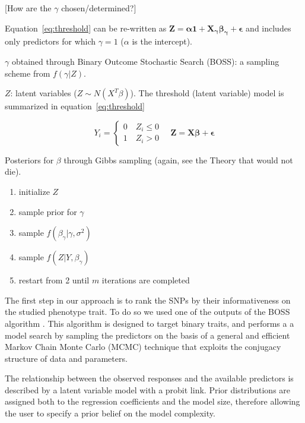[How are the $\gamma$ chosen/determined?]

Equation~\ref{eq:threshold} can be re-written as
$\mathbf{Z=\alpha1+X_{\gamma}\beta_{\gamma}+\epsilon}$ and includes only
predictors for which $\gamma=1$ ($\alpha$ is the intercept).


$\gamma$ obtained through Binary Outcome Stochastic Search (BOSS): a
sampling scheme from $f(\gamma|Z)$.



$Z$: latent variables ($Z \sim N(X^T\beta)$).
The threshold (latent variable) model is summarized in equation~\ref{eq:threshold}

\begin{equation}
Y_i = \left\{ 
\begin{array}{ll}
0 \quad Z_i \leq 0 \\
1 \quad Z_i > 0
\end{array}
\right.
\quad \mathbf{Z}=\mathbf{X\beta+\epsilon}
\label{eq:threshold}
\end{equation}
 
Posteriors for $\beta$ through Gibbs sampling (again, see the Theory
that would not die).

\begin{enumerate}
\item initialize $Z$
\item sample prior for $\gamma$
\item sample $f(\beta_{\gamma}|\gamma,\sigma^2)$
\item sample $f(Z|Y,\beta_{\gamma})$
\item restart from 2 until $m$ iterations are completed
\end{enumerate}

The first step in our approach is to rank the SNPs by their informativeness
on the studied phenotype trait. To do so we used one of the outputs of
the BOSS algorithm \cite{russu2012stochastic}. This algorithm is designed
to target binary traits, and performs a 
a model search by sampling the predictors on the
basis of a general and efficient Markov Chain
Monte Carlo (MCMC) technique that exploits the
conjugacy structure of data and parameters.

The relationship between the observed
responses and the available predictors is described
by a latent variable model with a probit link. Prior 
distributions are assigned both to
the regression coefficients and the model size,
therefore allowing the user to specify a prior
belief on the model complexity. 

